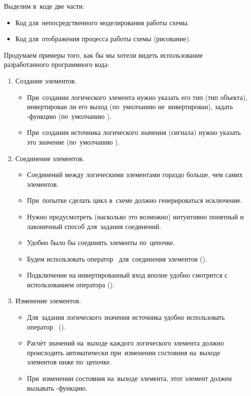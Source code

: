 \bigskip Выделим в~коде две части:
\begin{itemize}
  \item Код для~непосредственного моделирования работы схемы.
  \item Код для~отображения процесса работы схемы (рисование).
\end{itemize}

\bigskip Продумаем примеры того, как бы мы хотели видеть использование разработанного программного кода:
\begin{enumerate}
  \item Создание элементов.
  \begin{itemize}
    \item При~создании логического элемента нужно указать его тип (тип объекта), инвертирован ли его выход (по~умолчанию не~инвертирован), задать -функцию (по~умолчанию ).
    \item При~создании источника логического значения (сигнала) нужно указать это значение (по~умолчанию ).
  \end{itemize}

  \item Соединение элементов.
  \begin{itemize}
    \item Соединений между логическими элементами гораздо больше, чем самих элементов.
    \item При~попытке сделать цикл в~схеме должно генерироваться исключение.
    \item Нужно предусмотреть (насколько это возможно) интуитивно понятный и лаконичный способ для~задания соединений.
    \item Удобно было бы соединять элементы по~цепочке.
    \item Будем использовать оператор~\code{>>} для~соединения элементов ().
    \item Подключение на инвертированный вход вполне удобно смотрится с использованием оператора \code{\textasciitilde} ().
  \end{itemize}

  \item Изменение элементов.
  \begin{itemize}
    \item Для~задания логического значения источника удобно использовать оператор~\code{=} ().
    \item Расчёт значений на~выходе каждого логического элемента должно происходить автоматически при~изменении состояния на~выходе элементов ниже по~цепочке.
    \item При~изменении состояния на~выходе элемента, этот элемент должен вызывать -функцию.
  \end{itemize}


\end{enumerate}
